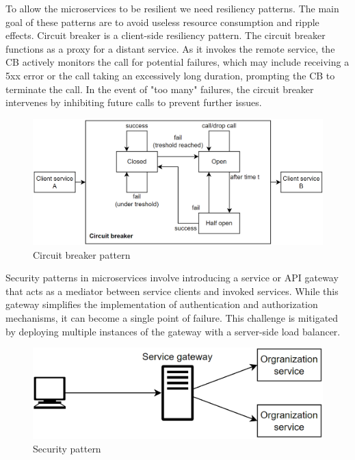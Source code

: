 To allow the microservices to be resilient we need resiliency patterns. 
The main goal of these patterns are to avoid useless resource consumption and ripple effects. 
Circuit breaker is a client-side resiliency pattern. 
The circuit breaker functions as a proxy for a distant service. 
As it invokes the remote service, the CB actively monitors the call for potential failures, which may include receiving a 5xx error or the call taking an excessively long duration, prompting the CB to terminate the call.
In the event of "too many" failures, the circuit breaker intervenes by inhibiting future calls to prevent further issues.
\begin{figure}[H]
    \centering
    \includegraphics[width=0.75\linewidth]{images/cb.png}
    \caption{Circuit breaker pattern}
\end{figure}

Security patterns in microservices involve introducing a service or API gateway that acts as a mediator between service clients and invoked services. 
While this gateway simplifies the implementation of authentication and authorization mechanisms, it can become a single point of failure. 
This challenge is mitigated by deploying multiple instances of the gateway with a server-side load balancer.
\begin{figure}[H]
    \centering
    \includegraphics[width=0.5\linewidth]{images/sp.png}
    \caption{Security pattern}
\end{figure}

